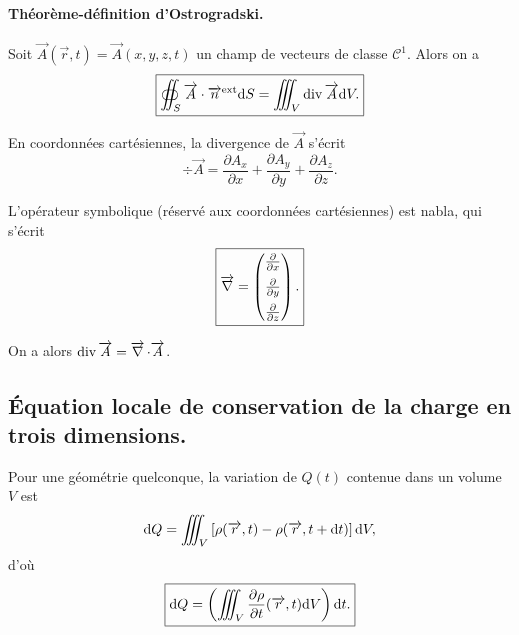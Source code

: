         \paragraph{Théorème-définition d'Ostrogradski.}

            Soit $\vec{A}(\vec{r},t)=\vec{A}(x,y,z,t)$ un champ de vecteurs de classe $\mathcal{C}^{1}$. Alors on a 
            \begin{equation}
                \boxed{
                    \oiint_{S}\protect\overrightarrow{{A}}\cdot\protect\overrightarrow{{n}}^{\text{ext}}\mathrm{d} S=\iiint_{V}\operatorname{div}\protect\overrightarrow{{A}}\mathrm{d} V.
                }
            \end{equation}

            En coordonnées cartésiennes, la divergence de $\vec{A}$ s'écrit 
            \begin{equation}
                \boxed{
                    \div\vec{A}=\frac{\partial A_x}{\partial x}+\frac{\partial A_y}{\partial y}+\frac{\partial A_z}{\partial z}.
                }
            \end{equation}

            L'opérateur symbolique (réservé aux coordonnées cartésiennes) est \og nabla\fg, qui s'écrit
            \begin{equation}
                \boxed{
                    \operatorname{\overrightarrow{\nabla}}=\begin{pmatrix}
                        \frac{\partial}{\partial x}\\[0.2cm]
                        \frac{\partial}{\partial y}\\[0.2cm]
                        \frac{\partial}{\partial z}
                    \end{pmatrix}.
                }
            \end{equation}

            On a alors $\operatorname{div}\protect\overrightarrow{{A}}=\operatorname{\overrightarrow{\nabla}}\cdot\protect\overrightarrow{{A}}$.

    \subsection{Équation locale de conservation de la charge en trois dimensions.}

        Pour une géométrie quelconque, la variation de $Q(t)$ contenue dans un volume $V$ est 
        \begin{equation}
            \mathrm{d} Q=\iiint_{V}\left[\rho(\protect\overrightarrow{{r}},t)-\rho(\protect\overrightarrow{{r}},t+\mathrm{d} t)\right]\mathrm{d} V,
        \end{equation}
        d'où 
        \begin{equation}
            \boxed{
                \mathrm{d} Q=\left(\iiint_{V}\frac{\partial \rho}{\partial t}(\protect\overrightarrow{{r}},t)\mathrm{d} V\right)\mathrm{d} t.
            }
        \end{equation}

